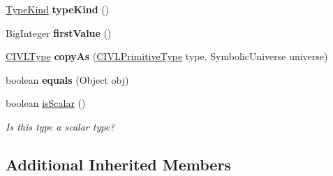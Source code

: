 \begin{DoxyCompactItemize}
\item 
\hypertarget{classedu_1_1udel_1_1cis_1_1vsl_1_1civl_1_1model_1_1common_1_1type_1_1CommonEnumType_a4d163934bd707a86878d7e36b7c1d7ba}{}\hyperlink{enumedu_1_1udel_1_1cis_1_1vsl_1_1civl_1_1model_1_1IF_1_1type_1_1CIVLType_1_1TypeKind}{Type\+Kind} {\bfseries type\+Kind} ()\label{classedu_1_1udel_1_1cis_1_1vsl_1_1civl_1_1model_1_1common_1_1type_1_1CommonEnumType_a4d163934bd707a86878d7e36b7c1d7ba}

\item 
\hypertarget{classedu_1_1udel_1_1cis_1_1vsl_1_1civl_1_1model_1_1common_1_1type_1_1CommonEnumType_a68e8f1c87ca837e8262d77b6406d2f2f}{}Big\+Integer {\bfseries first\+Value} ()\label{classedu_1_1udel_1_1cis_1_1vsl_1_1civl_1_1model_1_1common_1_1type_1_1CommonEnumType_a68e8f1c87ca837e8262d77b6406d2f2f}

\item 
\hypertarget{classedu_1_1udel_1_1cis_1_1vsl_1_1civl_1_1model_1_1common_1_1type_1_1CommonEnumType_a47fe63f5a5ba75e4bef827abf2e0b2d1}{}\hyperlink{interfaceedu_1_1udel_1_1cis_1_1vsl_1_1civl_1_1model_1_1IF_1_1type_1_1CIVLType}{C\+I\+V\+L\+Type} {\bfseries copy\+As} (\hyperlink{interfaceedu_1_1udel_1_1cis_1_1vsl_1_1civl_1_1model_1_1IF_1_1type_1_1CIVLPrimitiveType}{C\+I\+V\+L\+Primitive\+Type} type, Symbolic\+Universe universe)\label{classedu_1_1udel_1_1cis_1_1vsl_1_1civl_1_1model_1_1common_1_1type_1_1CommonEnumType_a47fe63f5a5ba75e4bef827abf2e0b2d1}

\item 
\hypertarget{classedu_1_1udel_1_1cis_1_1vsl_1_1civl_1_1model_1_1common_1_1type_1_1CommonEnumType_abf14cae745a1f4738eb84c3f4c0262e3}{}boolean {\bfseries equals} (Object obj)\label{classedu_1_1udel_1_1cis_1_1vsl_1_1civl_1_1model_1_1common_1_1type_1_1CommonEnumType_abf14cae745a1f4738eb84c3f4c0262e3}

\item 
boolean \hyperlink{classedu_1_1udel_1_1cis_1_1vsl_1_1civl_1_1model_1_1common_1_1type_1_1CommonEnumType_a3bc735a06a30b7aea263876a6880cb66}{is\+Scalar} ()
\begin{DoxyCompactList}\small\item\em Is this type a scalar type? \end{DoxyCompactList}\end{DoxyCompactItemize}
\subsection*{Additional Inherited Members}


